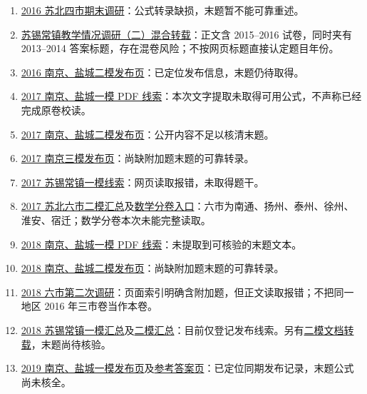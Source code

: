 \documentclass[UTF8]{ctexart}
\begin{document}
\begin{enumerate}
\item \href{https://max.book118.com/html/2016/0412/40228345.shtm}{2016 苏北四市期末调研}：公式转录缺损，末题暂不能可靠重述。
\item \href{https://www.renrendoc.com/paper/195156858.html}{苏锡常镇教学情况调研（二）混合转载}：正文含 2015--2016 试卷，同时夹有 2013--2014 答案标题，存在混卷风险；不按网页标题直接认定题目年份。
\item \href{https://gaokao.eol.cn/shiti/moniti/201603/t20160325_1380484.shtml}{2016 南京、盐城二模发布页}：已定位发布信息，末题仍待取得。
\item \href{https://imgs.app.gaokaozhitongche.com/resource/pdf/paper/202305/20230504165103_LpudIQ.pdf}{2017 南京、盐城一模 PDF 线索}：本次文字提取未取得可用公式，不声称已经完成原卷校读。
\item \href{https://app.gaokaozhitongche.com/news/10648}{2017 南京、盐城二模发布页}：公开内容不足以核清末题。
\item \href{https://gaokao.eol.cn/shiti/sx/201705/t20170510_1514413.shtml}{2017 南京三模发布页}：尚缺附加题末题的可靠转录。
\item \href{https://www.renjiaoshe.com/gaozhongshuxue/yilun/172495.html}{2017 苏锡常镇一模线索}：网页读取报错，未取得题干。
\item \href{https://news.koolearn.com/20170324/1115209.html}{2017 苏北六市二模汇总}及\href{https://news.koolearn.com/20170323/1115099.html}{数学分卷入口}：六市为南通、扬州、泰州、徐州、淮安、宿迁；数学分卷本次未能完整读取。
\item \href{https://imgs.app.gaokaozhitongche.com/resource/pdf/paper/202305/20230505003302_0So7fy.pdf}{2018 南京、盐城一模 PDF 线索}：未提取到可核验的末题文本。
\item \href{https://news.koolearn.com/20180321/1146694_2.html}{2018 南京、盐城二模发布页}：尚缺附加题末题的可靠转录。
\item \href{https://www.renjiaoshe.com/gaozhongshuxue/erlun/508681.html}{2018 六市第二次调研}：页面索引明确含附加题，但正文读取报错；不把同一地区 2016 年三市卷当作本卷。
\item \href{https://news.koolearn.com/20180320/1146651.html}{2018 苏锡常镇一模汇总}及\href{https://news.koolearn.com/20180503/1149614.html}{二模汇总}：目前仅登记发布线索。另有\href{https://max.book118.com/html/2019/0914/7103142025002055.shtm}{二模文档转载}，末题尚待核验。
\item \href{https://m.koolearn.com/news/20190115/1167775.html}{2019 南京、盐城一模发布页}及\href{https://zj.qinxue100.com/news/gz/112567.html}{参考答案页}：已定位同期发布记录，末题公式尚未核全。

\end{enumerate}
\end{document}
